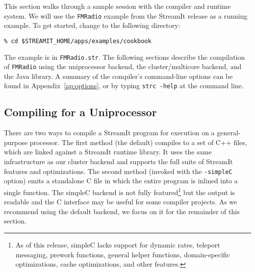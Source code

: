\newcommand{\entry}[1]{\raisebox{0pt}[24pt][20pt]{\parbox{2.75in}{#1}}}
\newcommand{\entrymed}[1]{\raisebox{0pt}[36pt][30pt]{\parbox{2.75in}{#1}}}
\newcommand{\entrybig}[1]{\raisebox{0pt}[42pt][36pt]{\parbox{2.75in}{#1}}}

This section walks through a sample session with the compiler and
runtime system.  We will use the {\tt FMRadio} example from the
StreamIt release as a running example.  To get started, change to the
following directory:
{\small
\begin{verbatim}
% cd $STREAMIT_HOME/apps/examples/cookbook
\end{verbatim}
}
\noindent The example is in {\tt FMRadio.str}. The following
sections describe the compilation of {\tt FMRadio} using the
uniprocessor backend, the cluster/multicore backend, and the Java
library.  A summary of the compiler's command-line options can be
found in Appendix~\ref{ap:options}, or by typing {\tt strc -help} at
the command line.

\subsection{Compiling for a Uniprocessor}

There are two ways to compile a StreamIt program for execution on a
general-purpose processor.  The first method (the default) compiles to
a set of C++ files, which are linked against a StreamIt runtime
library.  It uses the same infrastructure as our cluster backend and
supports the full suite of StreamIt features and optimizations.  The
second method (invoked with the {\tt -simpleC} option) emits a
standalone C file in which the entire program is inlined into a single
function.  The simpleC backend is not fully featured\footnote{As of
this release, simpleC lacks support for dynamic rates, teleport
messaging, prework functions, general helper functions,
domain-specific optimizations, cache optimizations, and other
features.} but the output is readable and the C interface may be
useful for some compiler projects.  As we recommend using the default
backend, we focus on it for the remainder of this section.

